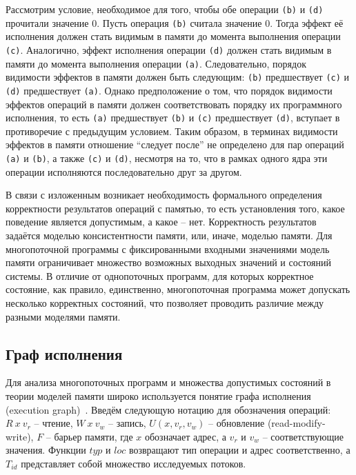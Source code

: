 Рассмотрим условие, необходимое для того, чтобы обе операции
\texttt{(b)} и \texttt{(d)} прочитали значение 0. Пусть операция
\texttt{(b)} считала значение 0. Тогда эффект её исполнения должен
стать видимым в памяти до момента выполнения операции \texttt{(c)}.
Аналогично, эффект исполнения операции \texttt{(d)} должен стать
видимым в памяти до момента выполнения операции \texttt{(a)}.
Следовательно, порядок видимости эффектов в памяти должен быть
следующим: \texttt{(b)} предшествует \texttt{(c)} и \texttt{(d)}
предшествует \texttt{(a)}. Однако предположение о том, что порядок
видимости эффектов операций в памяти должен соответствовать порядку
их программного исполнения, то есть \texttt{(a)} предшествует
\texttt{(b)} и \texttt{(c)} предшествует \texttt{(d)}, вступает в
противоречие с предыдущим условием. Таким образом, в терминах
видимости эффектов в памяти отношение ``следует после'' не определено
для пар операций \texttt{(a)} и \texttt{(b)}, а также \texttt{(c)} и
\texttt{(d)}, несмотря на то, что в рамках одного ядра эти операции
исполняются последовательно друг за другом.

\begin{minipage}[ht]{\textwidth}
  \centering
  
\end{minipage}

В связи с изложенным возникает необходимость формального определения
корректности результатов операций с памятью, то есть установления
того, какое поведение является допустимым, а какое -- нет.
Корректность результатов задаётся моделью консистентности памяти,
или, иначе, моделью памяти. Для многопоточной программы с
фиксированными входными значениями модель памяти ограничивает
множество возможных выходных значений и состояний системы. В отличие
от однопоточных программ, для которых корректное состояние, как
правило, единственно, многопоточная программа может допускать
несколько корректных состояний, что позволяет проводить различие
между разными моделями памяти.

\subsection{Граф исполнения}
\label{ch:ch1/exec_graph}

Для анализа многопоточных программ и множества допустимых состояний в
теории моделей памяти широко используется понятие графа исполнения
(execution graph)~\cite{ExecutionGraph}. Введём следующую нотацию для
обозначения операций: $R\ x\ v_{r}$ -- чтение, $W\ x\ v_{w}$ --
запись, $U(x,v_{r},v_{w})$ -- обновление (read-modify-write), $F$ --
барьер памяти, где $x$ обозначает адрес, а $v_{r}$ и $v_{w}$ --
соответствующие значения. Функции $typ$ и $loc$ возвращают тип
операции и адрес соответственно, а $T_{id}$ представляет собой
множество исследуемых потоков.

